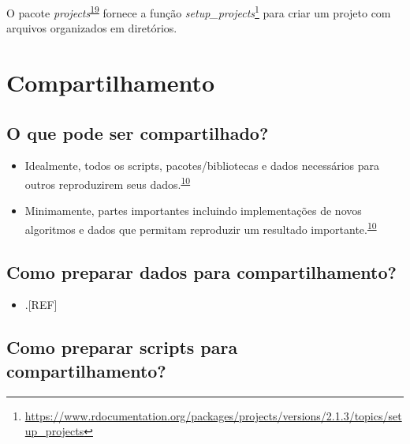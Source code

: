 \documentclass[
  a4paper,
]{book}
\providecommand{\tightlist}{%
  \setlength{\itemsep}{0pt}\setlength{\parskip}{0pt}}
\renewcommand{\href}[2]{#2\footnote{\url{#1}}}
\newenvironment{infobox}[1]
  {
  \begin{itemize}
  \renewcommand{\labelitemi}{
    \raisebox{-.7\height}[0pt][0pt]{
      {\setkeys{Gin}{width=3em,keepaspectratio}
        \texttt{[image: \#1]}}
    }
  }
  \setlength{\fboxsep}{1em}
  \begin{blackbox}
  \item
  }
  {
  \end{blackbox}
  \end{itemize}
  }
\begin{document}
\begin{infobox}{images/Rlogo}
O pacote \emph{projects}\textsuperscript{\protect\hyperlink{ref-projects}{19}} fornece a função \href{https://www.rdocumentation.org/packages/projects/versions/2.1.3/topics/setup_projects}{\emph{setup\_projects}} para criar um projeto com arquivos organizados em diretórios.

\end{infobox}

\hypertarget{compartilhamento}{%
\section{Compartilhamento}\label{compartilhamento}}

\hypertarget{o-que-pode-ser-compartilhado}{%
\subsection{O que pode ser compartilhado?}\label{o-que-pode-ser-compartilhado}}

\begin{itemize}
\item
  Idealmente, todos os scripts, pacotes/bibliotecas e dados necessários para outros reproduzirem seus dados.\textsuperscript{\protect\hyperlink{ref-Eglen2017}{10}}
\item
  Minimamente, partes importantes incluindo implementações de novos algoritmos e dados que permitam reproduzir um resultado importante.\textsuperscript{\protect\hyperlink{ref-Eglen2017}{10}}
\end{itemize}

\hypertarget{como-preparar-dados-para-compartilhamento}{%
\subsection{Como preparar dados para compartilhamento?}\label{como-preparar-dados-para-compartilhamento}}

\begin{itemize}
\tightlist
\item
  .{[}REF{]}
\end{itemize}

\hypertarget{como-preparar-scripts-para-compartilhamento}{%
\subsection{Como preparar scripts para compartilhamento?}\label{como-preparar-scripts-para-compartilhamento}}
\end{document}
